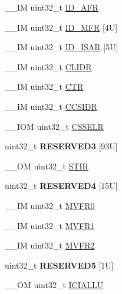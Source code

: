 \begin{DoxyCompactItemize}
\+\_\+\+\_\+\+IM uint32\+\_\+t \hyperlink{struct_s_c_b___type_a70c88751f9ace03b5ca3e364c65b9617}{I\+D\+\_\+\+A\+FR}
\item 
\+\_\+\+\_\+\+IM uint32\+\_\+t \hyperlink{struct_s_c_b___type_a1df83089e7726e2723e2c4f370814832}{I\+D\+\_\+\+M\+FR} \mbox{[}4\+U\mbox{]}
\item 
\+\_\+\+\_\+\+IM uint32\+\_\+t \hyperlink{struct_s_c_b___type_a966bd8b1d3dd6ab85b5db9b435f6fc1f}{I\+D\+\_\+\+I\+S\+AR} \mbox{[}5\+U\mbox{]}
\item 
\+\_\+\+\_\+\+IM uint32\+\_\+t \hyperlink{struct_s_c_b___type_a40b4dc749a25d1c95c2125e88683a591}{C\+L\+I\+DR}
\item 
\+\_\+\+\_\+\+IM uint32\+\_\+t \hyperlink{struct_s_c_b___type_aad937861e203bb05ae22c4369c458561}{C\+TR}
\item 
\+\_\+\+\_\+\+IM uint32\+\_\+t \hyperlink{struct_s_c_b___type_a90c793639fc9470e50e4f4fc4b3464da}{C\+C\+S\+I\+DR}
\item 
\+\_\+\+\_\+\+I\+OM uint32\+\_\+t \hyperlink{struct_s_c_b___type_ae627674bc3ccfc2d67caccfc1f4ea4ed}{C\+S\+S\+E\+LR}
\item 
\mbox{\label{struct_s_c_b___type_ad114787ec2c930bcdabf3f5668d93954}} 
uint32\+\_\+t {\bfseries R\+E\+S\+E\+R\+V\+E\+D3} \mbox{[}93\+U\mbox{]}
\item 
\+\_\+\+\_\+\+OM uint32\+\_\+t \hyperlink{struct_s_c_b___type_ada9cbba14ab1cc3fddd585f870932db8}{S\+T\+IR}
\item 
\mbox{\label{struct_s_c_b___type_af348cb636c453ec2e83974c0b38fe9d7}} 
uint32\+\_\+t {\bfseries R\+E\+S\+E\+R\+V\+E\+D4} \mbox{[}15\+U\mbox{]}
\item 
\+\_\+\+\_\+\+IM uint32\+\_\+t \hyperlink{struct_s_c_b___type_a9b0103b438c8922eaea5624f71afbbc8}{M\+V\+F\+R0}
\item 
\+\_\+\+\_\+\+IM uint32\+\_\+t \hyperlink{struct_s_c_b___type_a0a610dc4212de3ce1ad62e9afa76c728}{M\+V\+F\+R1}
\item 
\+\_\+\+\_\+\+IM uint32\+\_\+t \hyperlink{struct_s_c_b___type_a8353348c9336aa1aadcbf86b6f0f18c9}{M\+V\+F\+R2}
\item 
\mbox{\label{struct_s_c_b___type_a942b5bad37ebf529ebb15a33522ae475}} 
uint32\+\_\+t {\bfseries R\+E\+S\+E\+R\+V\+E\+D5} \mbox{[}1\+U\mbox{]}
\item 
\+\_\+\+\_\+\+OM uint32\+\_\+t \hyperlink{struct_s_c_b___type_a011024c365e7c5bd13a63830af60b10c}{I\+C\+I\+A\+L\+LU}

\end{DoxyCompactItemize}
